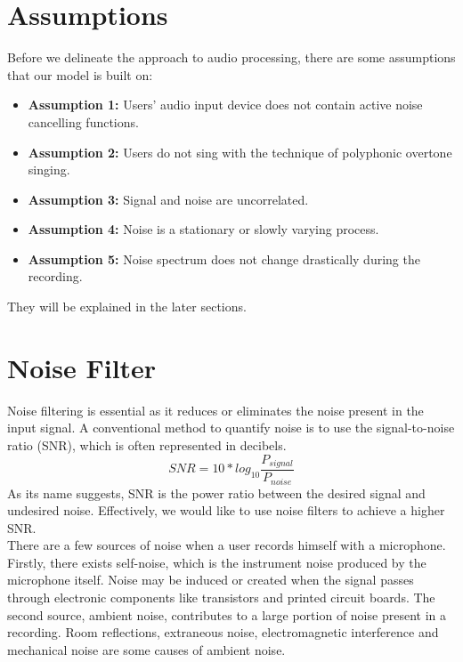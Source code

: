 \section{Assumptions}
Before we delineate the approach to audio processing, there are some assumptions that our model
is built on:
\begin{itemize}
    \item \textbf{Assumption 1:} Users' audio input device does not contain active noise cancelling functions.
    \item \textbf{Assumption 2:} Users do not sing with the technique of polyphonic overtone singing.
    \item \textbf{Assumption 3:} Signal and noise are uncorrelated.
    \item \textbf{Assumption 4:} Noise is a stationary or slowly varying process.
    \item \textbf{Assumption 5:} Noise spectrum does not change drastically during the recording.
\end{itemize}
They will be explained in the later sections.

\section{Noise Filter}
\label{sec:NF}
Noise filtering is essential as it reduces or eliminates the noise present in the input signal.
A conventional method to quantify noise is to use the signal-to-noise ratio (SNR), which is often 
represented in decibels.
\[SNR=10*log_{10}\frac{P_{signal}}{P_{noise}}\]
As its name suggests, SNR is the power ratio between the desired signal and undesired noise. Effectively,
we would like to use noise filters to achieve a higher SNR.\\ 
There are a few sources of noise when a user records himself with a microphone.
Firstly, there exists self-noise, which is the instrument noise produced by the microphone itself.
Noise may be induced or created when the signal passes through electronic components like transistors 
and printed circuit boards.
The second source, ambient noise, contributes to a large portion of noise present in a recording.
Room reflections, extraneous noise, electromagnetic interference and mechanical noise are some causes 
of ambient noise.  

